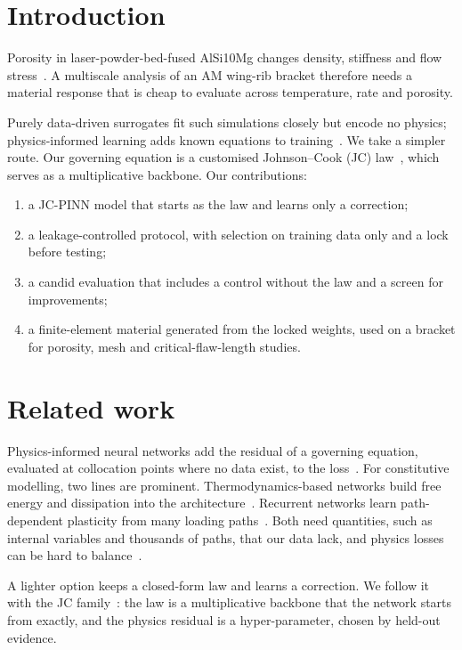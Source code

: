 \documentclass[conference]{IEEEtran}
\begin{document}
\section{Introduction}
Porosity in laser-powder-bed-fused AlSi10Mg changes density, stiffness and flow stress~\cite{kempen2012}. A multiscale analysis of an AM wing-rib bracket therefore needs a material response that is cheap to evaluate across temperature, rate and porosity.

Purely data-driven surrogates fit such simulations closely but encode no physics; physics-informed learning adds known equations to training~\cite{raissi2019,karniadakis2021,willard2022}. We take a simpler route. Our governing equation is a customised Johnson--Cook (JC) law~\cite{johnson1983}, which serves as a multiplicative backbone. Our contributions:
\begin{enumerate}
\item a JC-PINN model that starts as the law and learns only a correction;
\item a leakage-controlled protocol, with selection on training data only and a lock before testing;
\item a candid evaluation that includes a control without the law and a screen for improvements;
\item a finite-element material generated from the locked weights, used on a bracket for porosity, mesh and critical-flaw-length studies.
\end{enumerate}

\section{Related work}
Physics-informed neural networks add the residual of a governing equation, evaluated at collocation points where no data exist, to the loss~\cite{raissi2019,karniadakis2021,willard2022}. For constitutive modelling, two lines are prominent. Thermodynamics-based networks build free energy and dissipation into the architecture~\cite{masi2021}. Recurrent networks learn path-dependent plasticity from many loading paths~\cite{mozaffar2019}. Both need quantities, such as internal variables and thousands of paths, that our data lack, and physics losses can be hard to balance~\cite{krishnapriyan2021}.

A lighter option keeps a closed-form law and learns a correction. We follow it with the JC family~\cite{johnson1983}: the law is a multiplicative backbone that the network starts from exactly, and the physics residual is a hyper-parameter, chosen by held-out evidence.
\end{document}
